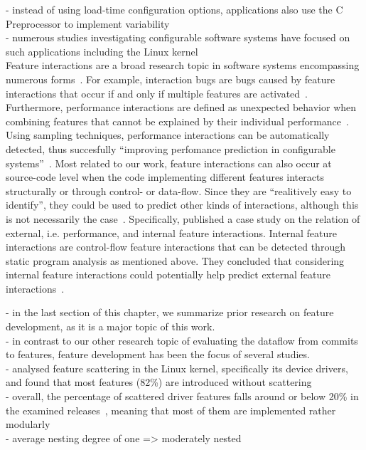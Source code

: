 - instead of using load-time configuration options, applications also use the C Preprocessor to implement variability \\
- numerous studies investigating configurable software systems have focused on such applications including the Linux kernel~\cite{} \\

Feature interactions are a broad research topic in software systems encompassing numerous forms~\cite{apel2014feature}.
For example, interaction bugs are bugs caused by feature interactions that occur if and only if multiple features are activated~\cite{nie2011survey}.
Furthermore, performance interactions are defined as unexpected behavior when combining features that cannot be explained by their individual performance~\cite{siegmund2012predicting}.
Using sampling techniques, performance interactions can be automatically detected, thus succesfully ``improving perfomance prediction in configurable systems''~\cite{apel2014feature}.
Most related to our work, feature interactions can also occur at source-code level when the code implementing different features interacts structurally or through control- or data-flow.
Since they are ``realitively easy to identify''\cite{apel2014feature}, they could be used to predict other kinds of interactions, although this is not necessarily the case~\cite{apel2014feature}.
Specifically, \citet{kolesnikov2017relation} published a case study on the relation of external, i.e. performance, and internal feature interactions.  
Internal feature interactions are control-flow feature interactions that can be detected through static program analysis as mentioned above. 
They concluded that considering internal feature interactions could potentially help predict external feature interactions~\cite{kolesnikov2017relation}.

- in the last section of this chapter, we summarize prior research on feature development, as it is a major topic of this work. \\
- in contrast to our other research topic of evaluating the dataflow from commits to features, feature development has been the focus of several studies. \\
- \citet{passos2021scattering} analysed feature scattering in the Linux kernel, specifically its device drivers, and found that most features (82\%) are introduced without scattering \\
- overall, the percentage of scattered driver features falls around or below 20\% in the examined releases~\cite{passos2021scattering}, meaning that most of them are implemented rather modularly \\
- \citet{liebig2010analysis} average nesting degree of one => moderately nested

